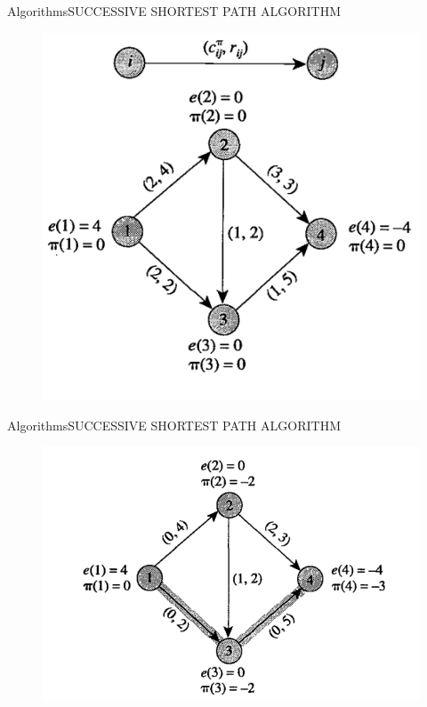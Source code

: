\documentclass{beamer}
\begin{document}
\begin{frame}{Algorithms}{SUCCESSIVE SHORTEST PATH ALGORITHM}
\begin{figure}[h!t]
\centering
\includegraphics[scale = 0.4 ]{figura1succesive.png}
\end{figure}
\end{frame}

\begin{frame}{Algorithms}{SUCCESSIVE SHORTEST PATH ALGORITHM}
\begin{figure}[h!t]
\centering
\includegraphics[scale = 0.5 ]{figura2succesive.png}
\end{figure}
\end{frame}
\end{document}
